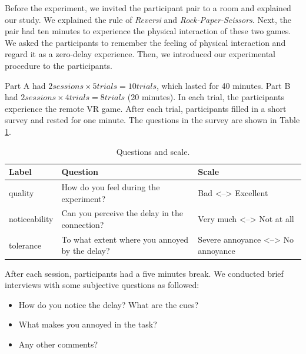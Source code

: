 
Before the experiment, we invited the participant pair to a room and explained our study. We explained the rule of \emph{Reversi} and \emph{Rock-Paper-Scissors}. Next, the pair had ten minutes to experience the physical interaction of these two games. We asked the participants to remember the feeling of physical interaction and regard it as a zero-delay experience. Then, we introduced our experimental procedure to the participants.

Part A had $2 sessions \times 5 trials = 10 trials$, which lasted for 40 minutes. Part B had $2 sessions \times 4 trials = 8 trials$ (20 minutes). In each trial, the participants experience the remote VR game. After each trial, participants filled in a short survey and rested for one minute. The questions in the survey are shown in Table \ref{tab:table_experiment}.

\begin{table} [!htbp]
\begin{tabular}{|p{}|p{}|p{}|}
\hline 
Label & Question & Scale \\
\hline
quality & How do you feel during the experiment? & Bad <--> Excellent \\
\hline
noticeability & Can you perceive the delay in the connection? & Very much <--> Not at all \\
\hline
tolerance & To what extent where you annoyed by the delay? & Severe annoyance <--> No annoyance \\
\hline
\end{tabular}
\caption{Questions and scale.}
\label{tab:table_experiment}
\end{table}

After each session, participants had a five minutes break. We conducted brief interviews with some subjective questions as followed:

\begin{itemize}
    \item How do you notice the delay? What are the cues?
    
    \item What makes you annoyed in the task?
    
    \item Any other comments?
\end{itemize}

